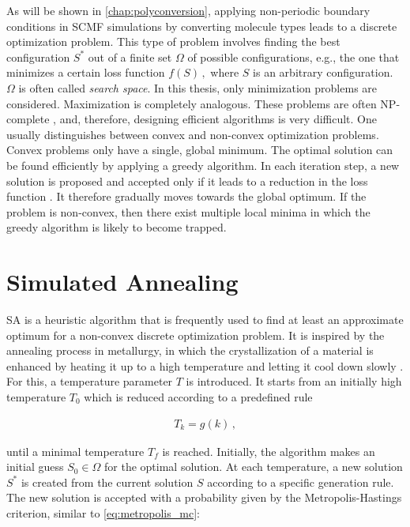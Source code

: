 \documentclass[bachelor,       %
               oneside,        %
               BCOR10mm,       %
               ngerman, english %
               ]{GAUBM}
\begin{document}
As will be shown in \autoref{chap:polyconversion}, applying non-periodic boundary conditions in \ac{SCMF} simulations by converting molecule types leads to a discrete optimization problem. This type of problem involves finding the best configuration $S^*$ out of a finite set $\Omega$ of possible configurations, e.g., the one that minimizes a certain loss function $f(S)\,,$ where $S$ is an arbitrary configuration. $\Omega$ is often called \textit{search space}. In this thesis, only minimization problems are considered. Maximization is completely analogous. These problems are often NP-complete \cite{gary1979computers}, and, therefore, designing efficient algorithms is very difficult. One usually distinguishes between convex and non-convex optimization problems. Convex problems only have a single, global minimum. The optimal solution can be found efficiently by applying a greedy algorithm. In each iteration step, a new solution is proposed and accepted only if it leads to a reduction in the loss function \cite{cormen01introduction}. It therefore gradually moves towards the global optimum. If the problem is non-convex, then there exist multiple local minima in which the greedy algorithm is likely to become trapped. 

\section{Simulated Annealing}
\label{sec:sa}
\ac{SA} \cite{simulated_annealing} is a heuristic algorithm that is frequently used to find at least an approximate optimum for a non-convex discrete optimization problem. It is inspired by the annealing process in metallurgy, in which the crystallization of a material is enhanced by heating it up to a high temperature and letting it cool down slowly \cite{sa_applications}. For this, a temperature parameter $T$ is introduced. It starts from an initially high temperature $T_0$ which is reduced according to a predefined rule

\begin{align}
    T_{k}=g(k)\,,
    \label{eq:cooling_schedule}
\end{align}

until a minimal temperature $T_f$ is reached. Initially, the algorithm makes an initial guess $S_0\in \Omega$ for the optimal solution. At each temperature, a new solution $S^*$ is created from the current solution $S$ according to a specific generation rule. The new solution is accepted with a probability given by the Metropolis-Hastings criterion, similar to \autoref{eq:metropolis_mc}:
\end{document}
